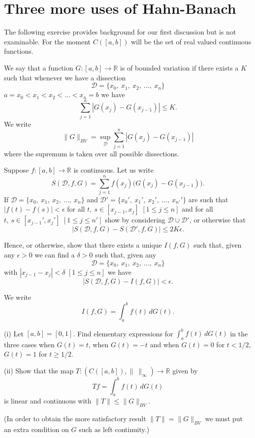 \section{Three more uses of Hahn-Banach} The following exercise
provides background for our first discussion but is not examinable.
For the moment $C([a,b])$ will be the set of real valued
continuous functions.
\begin{exercise} We say that a function $G:[a,b]\rightarrow{\mathbb R}$
is of bounded variation if there exists a $K$ such that
whenever we have a dissection 
\[{\mathcal D}=\{x_{0},\ x_{1},\ x_{2},\ \dots,\ x_{n}\}\]
$a=x_{0}<x_{1}<x_{2}<\dots<x_{n}=b$ we have
\[\sum_{j=1}^{n}|G(x_{j})-G(x_{j-1})|\leq K.\]
We write
\[\|G\|_{BV}=\sup_{\mathcal D}\sum_{j=1}^{n}|G(x_{j})-G(x_{j-1})|\]
where the supremum is taken over all possible dissections.

Suppose $f:[a,b]\rightarrow{\mathbb R}$ is continuous.
Let us write
\[S({\mathcal D},f,G)=\sum_{j=1}^{n}f(x_{j})\big(G(x_{j})-G(x_{j-1})\big).\]
If ${\mathcal D}=\{x_{0},\ x_{1},\ x_{2},\ \dots,\ x_{n}\}$
and ${\mathcal D'}=\{x_{0}',\ x_{1}',\ x_{2}',\ \dots,\ x_{n'}'\}$
are such that $|f(t)-f(s)|<\epsilon$ for all $t,\ s\in[x_{j-1},x_{j}]$
$[1\leq j\leq n]$ and for all $t,\ s\in[x_{j-1}',x_{j}']$
$[1\leq j\leq n']$ show by considering 
${\mathcal D}\cup{\mathcal D'}$, or otherwise that
\[|S({\mathcal D},f,G)-S({\mathcal D}',f,G)|\leq 2K\epsilon.\]

Hence, or otherwise, show that there exists a unique $I(f,G)$
such that, given any $\epsilon>0$ we can find a $\delta>0$
such that, given any 
\[{\mathcal D}=\{x_{0},\ x_{1},\ x_{2},\ \dots,\ x_{n}\}\]
with $|x_{j-1}-x_{j}|<\delta$ $[1\leq j\leq n]$ we have
\[|S({\mathcal D},f,G)-I(f,G)|<\epsilon.\] 

We write 
\[I(f,G)=\int_{a}^{b}f(t)\,dG(t).\]

(i) Let $[a,b]=[0,1]$. Find elementary expressions
for $\int_{a}^{b}f(t)\,dG(t)$ 
in the three cases when $G(t)=t$, when $G(t)=-t$
and when $G(t)=0$ for $t<1/2$, $G(t)=1$ for $t\geq 1/2$.

(ii) Show that the map $T:(C([a,b]),\|\ \|_{\infty})\rightarrow{\mathbb R}$
given by
\[Tf=\int_{a}^{b}f(t)\,dG(t)\]
is linear and continuous with $\|T\|\leq\|G\|_{BV}$.
\end{exercise}
(In order to obtain the more satisfactory result $\|T\|=\|G\|_{BV}$
we must put an extra condition on $G$ such as left continuity.)
